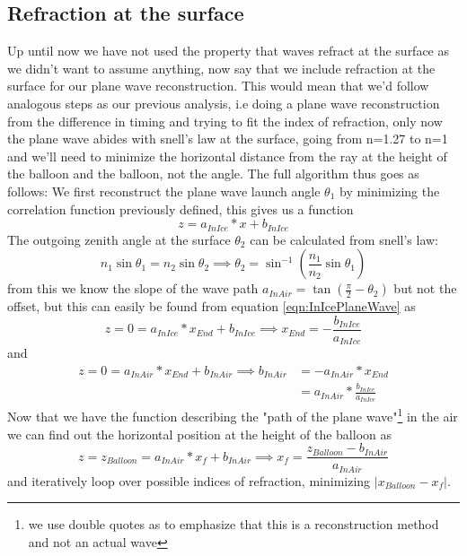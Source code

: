 \documentclass[11pt,a4paper,faculty=we,language=en,doctype=report]{cls/ugent-doc}
\begin{document}
\subsection{Refraction at the surface}
Up until now we have not used the property that waves refract at the surface as
we didn't want to assume anything, now say that we include refraction at the
surface for our plane wave reconstruction. This would mean that we'd follow
analogous steps as our previous analysis, i.e doing a plane wave reconstruction
from the difference in timing and trying to fit the index of refraction, only
now the plane wave abides with snell's law at the surface, going from n=1.27 to
n=1 and we'll need to minimize the horizontal distance from the ray at the
height of the balloon and the balloon, not the angle.  
The full algorithm thus goes as follows: We first reconstruct the
plane wave launch angle $\theta_1$ by minimizing the correlation function
previously defined, this gives us a function
\begin{equation}
	z = a_{InIce}*x + b_{InIce}
	\label{eqn:InIcePlaneWave}
\end{equation}
The outgoing zenith angle at the surface $\theta_2$ can be calculated from snell's law:
\begin{equation}
n_1 \sin{\theta_1} = n_2 \sin{\theta_2} \implies  \theta_2 = \sin^{-1}\left(\frac{n_1}{n_2}\sin{\theta_1}\right)
\end{equation}
from this we know the slope of the wave path $a_{InAir} = \tan\left({\frac{\pi}{2} -
\theta_2}\right)$ but not the offset, but this can easily be found from equation
\ref{eqn:InIcePlaneWave} as 
\begin{equation}
	z = 0 = a_{InIce}*x_{End} + b_{InIce} \implies x_{End} = -\frac{b_{InIce}}{a_{InIce}}
\end{equation}
and 
\begin{align}
	z = 0 = a_{InAir}*x_{End} + b_{InAir} \implies b_{InAir} &= -a_{InAir}*x_{End}
	\\&= a_{InAir}* \frac{b_{InIce}}{a_{InIce}}
\end{align}
Now that we have the function describing the "path of the plane wave"\footnote{we use double
quotes as to emphasize that this is a reconstruction method and not an actual wave} in the air 
we can find out the horizontal position at the height of the balloon as
\begin{equation}
	z = z_{Balloon} = a_{InAir}*x_{f} + b_{InAir} \implies x_f = \frac{z_{Balloon} - b_{InAir}}{a_{InAir}}
\end{equation}
and iteratively loop over possible indices of refraction, minimizing $|x_{Balloon} - x_f|$.
\end{document}
